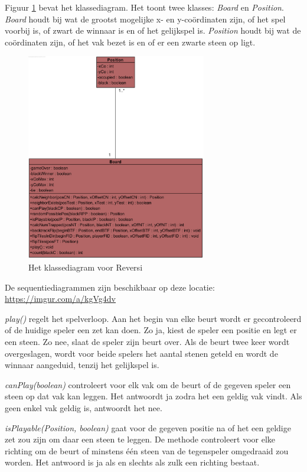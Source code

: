 Figuur \ref{fig:reversi-cd} bevat het klassediagram. Het toont twee klasses: \textit{Board} en \textit{Position}. \textit{Board} houdt bij wat de grootst mogelijke x- en y-co\"ordinaten zijn, of het spel voorbij is, of zwart de winnaar is en of het gelijkspel is. \textit{Position} houdt bij wat de co\"ordinaten zijn, of het vak bezet is en of er een zwarte steen op ligt.

\begin{figure}
	\centering
	\includegraphics[width=0.7\textwidth]{chap-evaluatie/reversi-cd.png}
	\caption{Het klassediagram voor Reversi}
	\label{fig:reversi-cd}
\end{figure}

De sequentiediagrammen zijn beschikbaar op deze locatie: \url{https://imgur.com/a/kgVg4dv} 

\textit{play()} regelt het spelverloop. Aan het begin van elke beurt wordt er gecontroleerd of de huidige speler een zet kan doen. Zo ja, kiest de speler een positie en legt er een steen. Zo nee, slaat de speler zijn beurt over. Als de beurt twee keer wordt overgeslagen, wordt voor beide spelers het aantal stenen geteld en wordt de winnaar aangeduid, tenzij het gelijkspel is.

\textit{canPlay(boolean)} controleert voor elk vak om de beurt of de gegeven speler een steen op dat vak kan leggen. Het antwoordt ja zodra het een geldig vak vindt. Als geen enkel vak geldig is, antwoordt het nee.

\textit{isPlayable(Position, boolean)} gaat voor de gegeven positie na of het een geldige zet zou zijn om daar een steen te leggen. De methode controleert voor elke richting om de beurt of minstens \'e\'en steen van de tegenspeler omgedraaid zou worden. Het antwoord is ja als en slechts als zulk een richting bestaat. 

